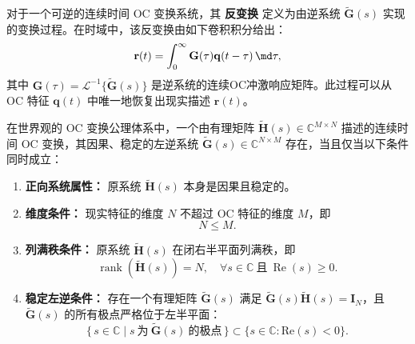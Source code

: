 \begin{definition}
    对于一个可逆的连续时间 OC 变换系统，其 \textbf{反变换} 定义为由逆系统 $\tilde{\mathbf{G}}(s)$ 实现的变换过程。在时域中，该反变换由如下卷积积分给出：
    \begin{equation}
        \mathbf{r}(t) = \int_{0}^{\infty} \mathbf{G}(\tau) \mathbf{q}(t-\tau) \, \md\tau,
        \label{eq:inv-cont}
    \end{equation}
    其中 $\mathbf{G}(\tau) = \mathcal{L}^{-1}\{\tilde{\mathbf{G}}(s)\}$ 是逆系统的连续OC冲激响应矩阵。此过程可以从 OC 特征 $\mathbf{q}(t)$ 中唯一地恢复出现实描述 $\mathbf{r}(t)$。
\end{definition}

\begin{theorem}
    \label{the:inv-cont-existence}
    在\wkn{}世界观的 OC 变换公理体系中，一个由有理矩阵 $\tilde{\mathbf{H}}(s)\in\mathbb{C}^{M \times N}$ 描述的连续时间 OC 变换，其因果、稳定的左逆系统 $\tilde{\mathbf{G}}(s)\in\mathbb{C}^{N \times M}$ 存在，当且仅当以下条件同时成立：

    \begin{enumerate}
        \item \textbf{正向系统属性：} 原系统 $\tilde{\mathbf{H}}(s)$ 本身是因果且稳定的。

        \item \textbf{维度条件：} 现实特征的维度 $N$ 不超过 OC 特征的维度 $M$，即
              \begin{equation}
                  N \leq M.
              \end{equation}

        \item \textbf{列满秩条件：} 原系统 $\tilde{\mathbf{H}}(s)$ 在闭右半平面列满秩，即
              \begin{equation}
                  \operatorname{rank}(\tilde{\mathbf{H}}(s)) = N,\quad \forall s\in\mathbb{C}\ \text{且}\ \operatorname{Re}(s)\geq 0.
              \end{equation}

        \item \textbf{稳定左逆条件：} 存在一个有理矩阵 $\tilde{\mathbf{G}}(s)$ 满足 $\tilde{\mathbf{G}}(s)\tilde{\mathbf{H}}(s)=\mathbf{I}_N$，且 $\tilde{\mathbf{G}}(s)$ 的所有极点严格位于左半平面：
              \begin{equation}
                  \{\,s\in\mathbb{C}\mid s\ \text{为}\ \tilde{\mathbf{G}}(s)\ \text{的极点}\,\}
                  \subset
                  \{s\in\mathbb{C}:\mathrm{Re}(s)<0\}.
              \end{equation}
    \end{enumerate}
\end{theorem}

